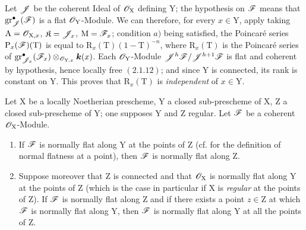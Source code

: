 Let $\mathscr{J}$ be the coherent Ideal of $\mathscr{O}_\mathrm{X}$ defining $\mathrm{Y}$; the hypothesis on $\mathscr{F}$ means that $\operatorname{gr}_{\mathscr{J}}^\bullet(\mathscr{F})$ is a flat $\mathscr{O}_\mathrm{Y}$-Module. We can therefore, for every $x\in\mathrm{Y}$, apply  taking $\mathrm{A}=\mathscr{O}_{\mathrm{X},x}$, $\mathfrak K=\mathscr{J}_x$, $\mathrm{M}=\mathscr{F}_x$; condition $a)$ being satisfied, the Poincar\'e series $\mathrm{P}_x(\mathscr{F})(\mathrm{T})$ is equal to $\mathrm{R}_x(\mathrm{T})(1-\mathrm{T})^{-n}$, where $\mathrm{R}_x(\mathrm{T})$ is the Poincar\'e series of $\operatorname{gr}_{\mathscr{J}_x}^\bullet(\mathscr{F}_x)\otimes_{\mathscr{O}_{\mathrm{Y},x}}\boldsymbol{k}(x)$. Each $\mathscr{O}_\mathrm{Y}$-Module $\mathscr{J}^h\mathscr{F}/\mathscr{J}^{h+1}\mathscr{F}$ is flat and coherent by hypothesis, hence locally free $(2.1.12)$; and since $\mathrm{Y}$ is connected, its rank is constant on $\mathrm{Y}$. This proves that $\mathrm{R}_x(\mathrm{T})$ is \emph{independent} of $x\in\mathrm{Y}$.

\begin{corollary}[19.7.5]
\label{IV.19.7.5}
Let $\mathrm{X}$ be a locally Noetherian prescheme, $\mathrm{Y}$ a closed sub-prescheme of $\mathrm{X}$, $\mathrm{Z}$ a closed sub-prescheme of $\mathrm{Y}$; one supposes $\mathrm{Y}$ and $\mathrm{Z}$ regular. Let $\mathscr{F}$ be a coherent $\mathscr{O}_\mathrm{X}$-Module.
\begin{enumerate}
\item[\rm(i)] If $\mathscr{F}$ is normally flat along $\mathrm{Y}$ at the points of $\mathrm{Z}$ \textup{(cf.  for the definition of normal flatness at a point)}, then $\mathscr{F}$ is normally flat along $\mathrm{Z}$.
\item[\rm(ii)] Suppose moreover that $\mathrm{Z}$ is connected and that $\mathscr{O}_\mathrm{X}$ is normally flat along $\mathrm{Y}$ at the points of $\mathrm{Z}$ \textup{(which is the case in particular if $\mathrm{X}$ is \emph{regular} at the points of $\mathrm{Z}$)}. If $\mathscr{F}$ is normally flat along $\mathrm{Z}$ and if there exists \textup{a} point $z\in\mathrm{Z}$ at which $\mathscr{F}$ is normally flat along $\mathrm{Y}$, then $\mathscr{F}$ is normally flat along $\mathrm{Y}$ at all the points of $\mathrm{Z}$.
\end{enumerate}
\end{corollary}


